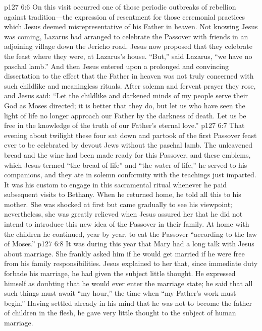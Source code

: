 \vs p127 6:6 On this visit occurred one of those periodic outbreaks of rebellion against tradition---the expression of resentment for those ceremonial practices which Jesus deemed misrepresentative of his Father in heaven. Not knowing Jesus was coming, Lazarus had arranged to celebrate the Passover with friends in an adjoining village down the Jericho road. Jesus now proposed that they celebrate the feast where they were, at Lazarus’s house. “But,” said Lazarus, “we have no paschal lamb.” And then Jesus entered upon a prolonged and convincing dissertation to the effect that the Father in heaven was not truly concerned with such childlike and meaningless rituals. After solemn and fervent prayer they rose, and Jesus said: \textcolor{ubdarkred}{“Let the childlike and darkened minds of my people serve their God as Moses directed; it is better that they do, but let us who have seen the light of life no longer approach our Father by the darkness of death. Let us be free in the knowledge of the truth of our Father’s eternal love.”}
\vs p127 6:7 That evening about twilight these four sat down and partook of the first Passover feast ever to be celebrated by devout Jews without the paschal lamb. The unleavened bread and the wine had been made ready for this Passover, and these emblems, which Jesus termed \textcolor{ubdarkred}{“the bread of life”} and “the water of life,” he served to his companions, and they ate in solemn conformity with the teachings just imparted. It was his custom to engage in this sacramental ritual whenever he paid subsequent visits to Bethany. When he returned home, he told all this to his mother. She was shocked at first but came gradually to see his viewpoint; nevertheless, she was greatly relieved when Jesus assured her that he did not intend to introduce this new idea of the Passover in their family. At home with the children he continued, year by year, to eat the Passover “according to the law of Moses.”
\pc \vs p127 6:8 It was during this year that Mary had a long talk with Jesus about marriage. She frankly asked him if he would get married if he were free from his family responsibilities. Jesus explained to her that, since immediate duty forbade his marriage, he had given the subject little thought. He expressed himself as doubting that he would ever enter the marriage state; he said that all such things must await \textcolor{ubdarkred}{“my hour,”} the time when \textcolor{ubdarkred}{“my Father’s work must begin.”} Having settled already in his mind that he was not to become the father of children in the flesh, he gave very little thought to the subject of human marriage.

